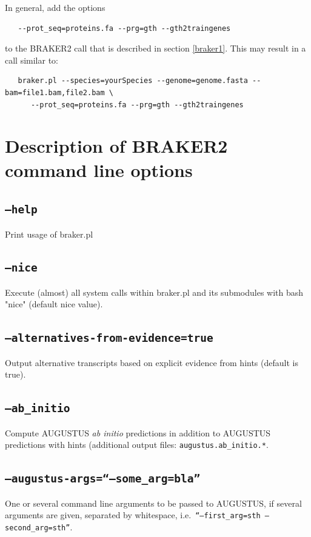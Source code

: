 \documentclass[a4paper,10pt]{report}
\begin{document}
In general, add the options

\begin{verbatim}
   --prot_seq=proteins.fa --prg=gth --gth2traingenes
\end{verbatim}

to the BRAKER2 call that is described in section \ref{braker1}. This may result in a call similar to:

\begin{verbatim}
   braker.pl --species=yourSpecies --genome=genome.fasta --bam=file1.bam,file2.bam \
      --prot_seq=proteins.fa --prg=gth --gth2traingenes
\end{verbatim}

\section{Description of BRAKER2 command line options}\label{options}

\subsection{\texttt{--help}}                               

Print usage of braker.pl

\subsection{\texttt{--nice}}

Execute (almost) all system calls within braker.pl and its submodules with bash "nice" (default nice value).

\subsection{\texttt{--alternatives-from-evidence=true}}    

Output alternative transcripts based on explicit evidence from hints (default is true).

\subsection{\texttt{--ab\_initio}}

Compute AUGUSTUS \textit{ab initio} predictions in addition to AUGUSTUS predictions with hints (additional output files: \texttt{augustus.ab\_initio.*}.

\subsection{\texttt{--augustus-args=``--some\_arg=bla''}}     
One or several command line arguments to be passed to AUGUSTUS, if several arguments are given, separated by whitespace, i.e.~\texttt{``--first\_arg=sth --second\_arg=sth''}. 
    
\end{document}
